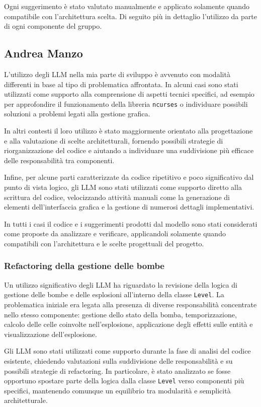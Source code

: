 \documentclass[a4paper,11pt]{article}
\begin{document}
Ogni suggerimento è stato valutato manualmente e applicato solamente quando
compatibile con l'architettura scelta. Di seguito più in dettaglio l'utilizzo 
da parte di ogni componente del gruppo.

\subsection{Andrea Manzo}

L'utilizzo degli LLM nella mia parte di sviluppo è avvenuto con modalità differenti in base al tipo di problematica affrontata. 
In alcuni casi sono stati utilizzati come supporto alla comprensione di aspetti tecnici specifici, 
ad esempio per approfondire il funzionamento della libreria \texttt{ncurses} o individuare possibili soluzioni 
a problemi legati alla gestione grafica. 

In altri contesti il loro utilizzo è stato maggiormente orientato alla progettazione e alla valutazione di scelte architetturali, fornendo possibili strategie di riorganizzazione del codice e aiutando a individuare una suddivisione più efficace delle responsabilità tra componenti.

Infine, per alcune parti caratterizzate da codice ripetitivo e poco significativo dal punto di vista logico, gli LLM sono stati utilizzati come supporto diretto alla scrittura del codice, velocizzando attività manuali come la generazione di elementi dell'interfaccia grafica e la gestione di numerosi dettagli implementativi.

In tutti i casi il codice e i suggerimenti prodotti dal modello sono stati considerati come proposte da analizzare e verificare, applicandoli solamente quando compatibili con l'architettura e le scelte progettuali del progetto.
\subsubsection{Refactoring della gestione delle bombe}

Un utilizzo significativo degli LLM ha riguardato la revisione della logica di gestione delle bombe e delle esplosioni all'interno della classe \texttt{Level}. 
La problematica iniziale era legata alla presenza di diverse responsabilità concentrate nello stesso componente: gestione dello stato della bomba, temporizzazione, calcolo delle celle coinvolte nell'esplosione, applicazione degli effetti sulle entità e visualizzazione dell'esplosione.

Gli LLM sono stati utilizzati come supporto durante la fase di analisi del codice esistente, chiedendo valutazioni sulla suddivisione delle responsabilità e su possibili strategie di refactoring. 
In particolare, è stato analizzato se fosse opportuno spostare parte della logica dalla classe \texttt{Level} verso componenti più specifici, mantenendo comunque un equilibrio tra modularità e semplicità architetturale.
\end{document}
